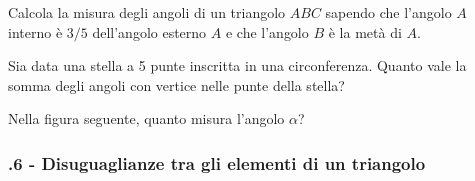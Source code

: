 \begin{multicols}{2}
\begin{esercizio}
\label{ese:3.76}
Calcola la misura degli angoli di un triangolo $ABC$ sapendo che l'angolo $A$ interno è $3/5$ dell'angolo esterno $A$ e che l'angolo $B$ è la metà di $A$.
\end{esercizio}

\begin{esercizio}
\label{ese:3.77}
Sia data una stella a 5 punte inscritta in una circonferenza. Quanto vale la somma degli angoli con vertice nelle punte della stella? 
\end{esercizio}

\begin{esercizio}
\label{ese:3.78}
Nella figura seguente, quanto misura l'angolo $\alpha$?  
\end{esercizio}

\centering


\end{multicols}

\subsubsection*{\thechapter.6 - Disuguaglianze tra gli elementi di un triangolo}

